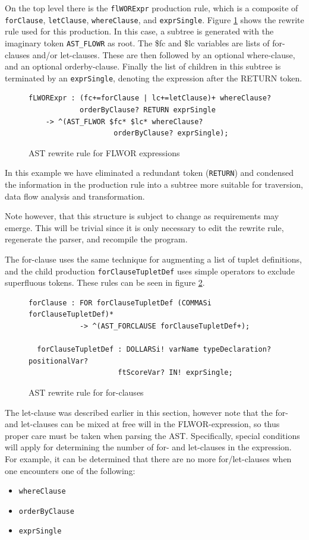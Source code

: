 On the top level there is the \verb!flWORExpr! production rule, which is a
composite of \verb!forClause!, \verb!letClause!, \verb!whereClause!, and
\verb!exprSingle!. Figure \ref{code:ast:flwor} shows the rewrite rule used for
this production. In this case, a subtree is generated with the imaginary token
\verb!AST_FLOWR! as root. The \$fc and \$lc variables are lists of
for-clauses and/or let-clauses. These are then followed by an optional
where-clause, and an optional orderby-clause. Finally the list of children in
this subtree is terminated by an \verb!exprSingle!, denoting the expression
after the RETURN token.

\begin{figure}[h!]
\begin{verbatim}
fLWORExpr : (fc+=forClause | lc+=letClause)+ whereClause?
            orderByClause? RETURN exprSingle
    -> ^(AST_FLWOR $fc* $lc* whereClause?
                    orderByClause? exprSingle);
\end{verbatim}
\caption{AST rewrite rule for FLWOR expressions}
\label{code:ast:flwor}
\end{figure}

In this example we have eliminated a redundant token (\verb!RETURN!) and
condensed the information in the production rule into a subtree more suitable
for traversion, data flow analysis and transformation.

Note however, that this structure is subject to change as requirements may 
emerge. This will be trivial since it is only necessary to edit the rewrite
rule, regenerate the parser, and recompile the program.

The for-clause uses the same technique for augmenting a list of tuplet
definitions, and the child production \verb!forClauseTupletDef! uses simple
operators to exclude superfluous tokens. These rules can be seen in figure
\ref{code:ast:forclause}. 

\begin{figure}[h!]
\begin{verbatim} 
forClause : FOR forClauseTupletDef (COMMASi forClauseTupletDef)* 
            -> ^(AST_FORCLAUSE forClauseTupletDef+);

  forClauseTupletDef : DOLLARSi! varName typeDeclaration? positionalVar? 
                     ftScoreVar? IN! exprSingle;
\end{verbatim}
\caption{AST rewrite rule for for-clauses}
\label{code:ast:forclause}
\end{figure}

The let-clause was described earlier in this section, however note that the for-
and let-clauses can be mixed at free will in the FLWOR-expression, so thus
proper care must be taken when parsing the AST. Specifically, special conditions
will apply for determining the number of for- and let-clauses in the expression.
For example, it can be determined that there are no more for/let-clauses when
one encounters one of the following:
\begin{itemize}
  \item \verb!whereClause!
  \item \verb!orderByClause!
  \item \verb!exprSingle!
\end{itemize}

